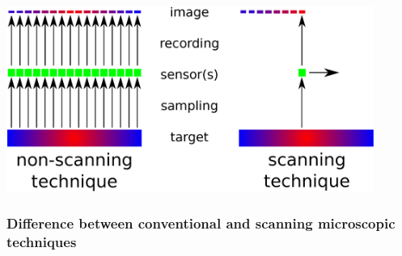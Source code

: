 \documentclass{beamer}
\begin{document}
\begin{frame}
	\centering
	\includegraphics[width=0.9\textwidth]{microscopy.eps}
	\frametitle{Difference between conventional and scanning microscopic techniques}
\end{frame}
\end{document}
